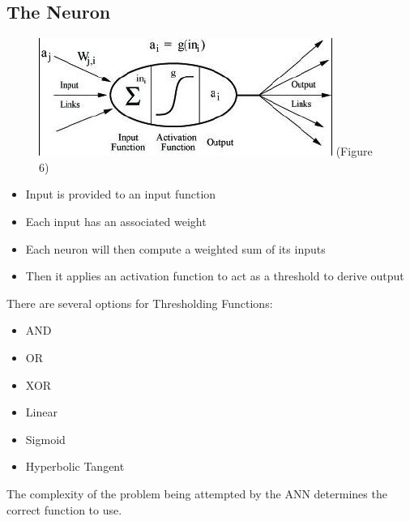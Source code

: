 \documentclass{beamer}
\begin{document}
\subsection{The Neuron}

\begin{frame}

\begin{figure}

	\center \includegraphics[scale=.8]{neuron_image.jpg}
	\center \tiny(Figure 6)

\end{figure}

\end{frame}

\begin{frame}

\begin{itemize}
\item Input is provided to an input function
\item Each input has an associated weight
\item Each neuron will then compute a weighted sum of its inputs 
\item Then it applies an activation function to act as a threshold to derive output
\end{itemize}

\end{frame}

\begin{frame}

There are several options for Thresholding Functions:

\begin{itemize}
\item AND
\item OR
\item XOR
\item Linear
\item Sigmoid
\item Hyperbolic Tangent 
\end{itemize}

The complexity of the problem being attempted by the ANN determines the correct function to use.

\end{frame}
\end{document}
